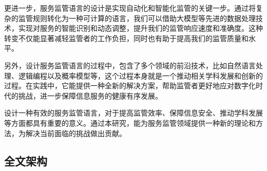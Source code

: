 更进一步，服务监管语言的设计是实现自动化和智能化监管的关键一步。通过将复杂的监管规则转化为一种可计算的语言，我们可以借助大模型等先进的数据处理技术，实现对服务的智能识别和动态调整，提升我们的监管响应速度和准确度。这种转变不仅能显著减轻监管者的工作负担，同时也有助于提高我们的监管质量和水平。

另外，设计服务监管语言的过程中，包含了多个领域的前沿技术，比如自然语言处理、逻辑编程以及概率模型等，这个过程本身就是一个推动相关学科发展和创新的过程。在实践中，它能提供一种全新的解决方案，帮助监管者更好地应对数字化时代的挑战，进一步保障信息服务的健康有序发展。

设计一种有效的服务监管语言，对于提高监管效率、保障信息安全、推动学科发展等方面都具有重要的意义。通过本研究，能为服务监管领域提供一种新的理论和方法，为解决当前面临的挑战做出贡献。

\subsection{全文架构}


